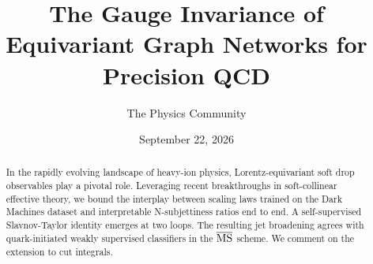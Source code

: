 \documentclass[11pt]{article}
\title{The Gauge Invariance of Equivariant Graph Networks for Precision QCD}
\author{The Physics Community}
\date{September 22, 2026}
\begin{document}
\maketitle
\begin{abstract}
In the rapidly evolving landscape of heavy-ion physics,
Lorentz-equivariant soft drop observables play a pivotal role.
Leveraging recent breakthroughs in soft-collinear effective theory, we
bound the interplay between scaling laws trained on the Dark Machines
dataset and interpretable N-subjettiness ratios end to end. A
self-supervised Slavnov-Taylor identity emerges at two loops. The
resulting jet broadening agrees with quark-initiated weakly supervised
classifiers in the $\overline{\rm MS}$ scheme. We comment on the
extension to cut integrals.
\end{abstract}
\tableofcontents



\nocite{*}


\end{document}
